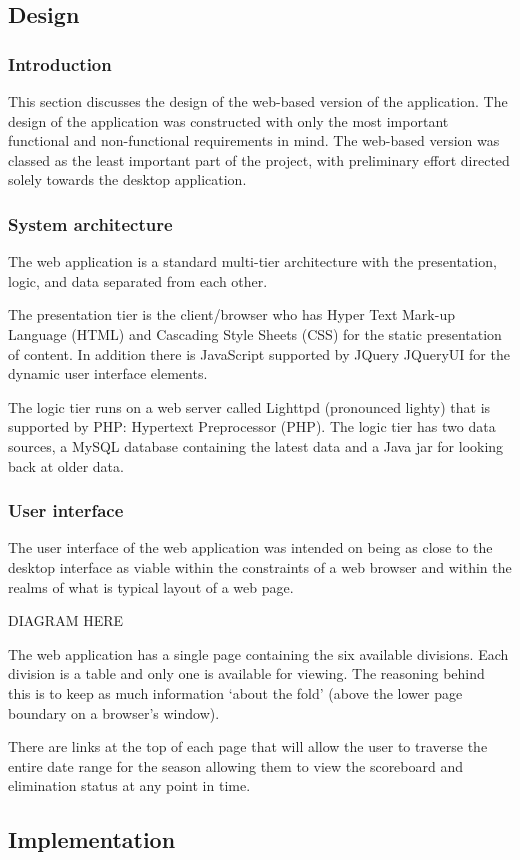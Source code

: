 \subsection{Design}

\subsubsection{Introduction}

This section discusses the design of the web-based version of the application.
The design of the application was constructed with only the most important
functional and non-functional requirements in mind. The web-based version was
classed as the least important part of the project, with preliminary effort
directed solely towards the desktop application.

\subsubsection{System architecture}

The web application is a standard multi-tier architecture with the presentation,
logic, and data separated from each other.

The presentation tier is the client/browser who has Hyper Text Mark-up Language
(HTML) and Cascading Style Sheets (CSS) for the static presentation of content.
In addition there is JavaScript supported by JQuery JQueryUI for the dynamic
user interface elements.

The logic tier runs on a web server called Lighttpd (pronounced lighty) that is
supported by PHP: Hypertext Preprocessor (PHP). The logic tier has two data
sources, a MySQL database containing the latest data and a Java jar for looking
back at older data.

\subsubsection{User interface}

The user interface of the web application was intended on being as close to the
desktop interface as viable within the constraints of a web browser and within
the realms of what is typical layout of a web page.

DIAGRAM HERE%

The web application has a single page containing the six available divisions.
Each division is a table and only one is available for viewing. The reasoning
behind this is to keep as much information `about the fold' (above the lower
page boundary on a browser's window).

There are links at the top of each page that will allow the user to traverse
the entire date range for the season allowing them to view the scoreboard and
elimination status at any point in time.

\subsection{Implementation}
